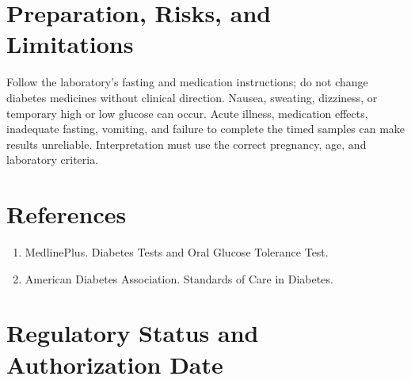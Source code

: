 \section*{Preparation, Risks, and Limitations}
Follow the laboratory's fasting and medication instructions; do not change diabetes medicines without clinical direction. Nausea, sweating, dizziness, or temporary high or low glucose can occur. Acute illness, medication effects, inadequate fasting, vomiting, and failure to complete the timed samples can make results unreliable. Interpretation must use the correct pregnancy, age, and laboratory criteria.

\section*{References}
\begin{enumerate}
  \item MedlinePlus. Diabetes Tests and Oral Glucose Tolerance Test.
  \item American Diabetes Association. Standards of Care in Diabetes.
\end{enumerate}

\clearpage


\section*{Regulatory Status and Authorization Date}

\clearpage
